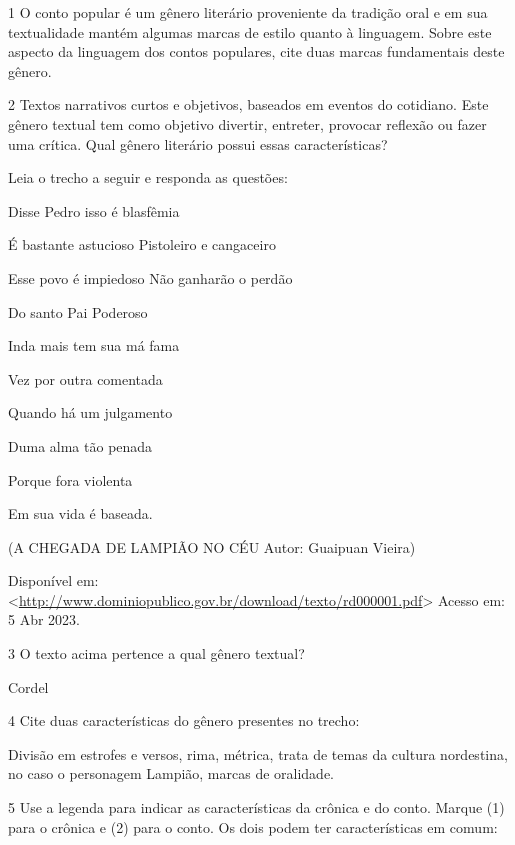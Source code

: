{

\num{1} O conto popular é um gênero literário proveniente da tradição oral e em sua textualidade mantém algumas marcas de estilo quanto à linguagem. Sobre este aspecto da linguagem dos contos populares, cite duas marcas fundamentais deste gênero.


\num{2} Textos narrativos curtos e objetivos, baseados em eventos do cotidiano. Este gênero textual tem como objetivo divertir, entreter, provocar reflexão ou fazer uma crítica. Qual gênero literário possui essas características?


Leia o trecho a seguir e responda as questões:

Disse Pedro isso é blasfêmia

É bastante astucioso Pistoleiro e cangaceiro

Esse povo é impiedoso Não ganharão o perdão

Do santo Pai Poderoso

Inda mais tem sua má fama

Vez por outra comentada

Quando há um julgamento

Duma alma tão penada

Porque fora violenta

Em sua vida é baseada.

(A CHEGADA DE LAMPIÃO NO CÉU Autor: Guaipuan Vieira)

Disponível em:
\textless{}\href{http://www.dominiopublico.gov.br/download/texto/rd000001.pdf}{\uline{http://www.dominiopublico.gov.br/download/texto/rd000001.pdf}}\textgreater{}
Acesso em: 5 Abr 2023.

\num{3} O texto acima pertence a qual gênero textual?

Cordel

\num{4} Cite duas características do gênero presentes no trecho:

Divisão em estrofes e versos, rima, métrica, trata de temas da cultura
nordestina, no caso o personagem Lampião, marcas de oralidade.

\num{5} Use a legenda para indicar as características da crônica e do conto.
  Marque (1) para o crônica e (2) para o conto. Os dois podem ter
  características em comum:

}
